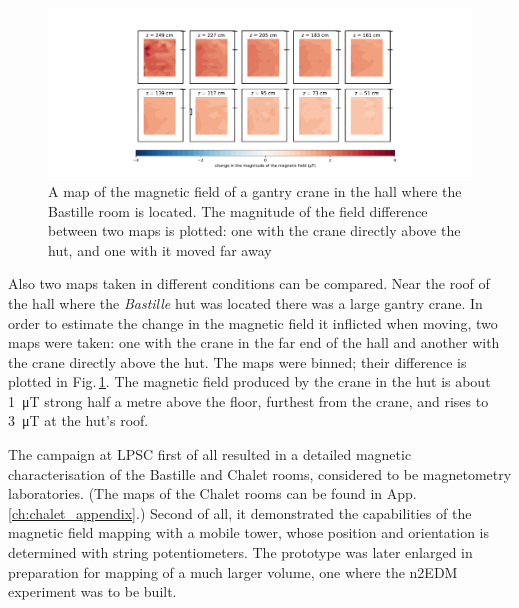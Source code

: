 \begin{figure}
  \centering
  \includegraphics[width=\linewidth]{gfx/mapping/lpsc/bastille_crane_change_magnitude_crop.pdf}
  \caption{A map of the magnetic field of a gantry crane in the hall where the Bastille room is located. The magnitude of the field difference between two maps is plotted: one with the crane directly above the hut, and one with it moved far away}\label{fig:mapping_bastille_crane_change}
\end{figure}

Also two maps taken in different conditions can be compared. Near the roof of the hall where the \emph{Bastille} hut was located there was a large gantry crane. In order to estimate the change in the magnetic field it inflicted when moving, two maps were taken: one with the crane in the far end of the hall and another with the crane directly above the hut. The maps were binned; their difference is plotted in Fig.\,\ref{fig:mapping_bastille_crane_change}. The magnetic field produced by the crane in the hut is about \SI{1}{\micro\tesla} strong half a metre above the floor, furthest from the crane, and rises to \SI{3}{\micro\tesla} at the hut's roof.



The campaign at LPSC first of all resulted in a detailed magnetic characterisation of the Bastille and Chalet rooms, considered to be magnetometry laboratories. (The maps of the Chalet rooms can be found in App.\,\ref{ch:chalet_appendix}.) Second of all, it demonstrated the capabilities of the magnetic field mapping with a mobile tower, whose position and orientation is determined with string potentiometers. The prototype was later enlarged in preparation for mapping of a much larger volume, one where the n2EDM experiment was to be built.



